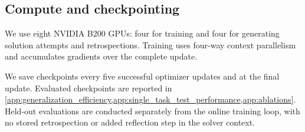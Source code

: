 \subsection{Compute and checkpointing}

We use eight NVIDIA B200 GPUs: four for training and four for
generating solution attempts and retrospections. Training uses
four-way context parallelism and accumulates gradients over the
complete update.

We save checkpoints every five successful optimizer updates and at the
final update. Evaluated checkpoints are reported in
\cref{app:generalization_efficiency,app:single_task_test_performance,app:ablations}.
Held-out evaluations are conducted separately from the online training
loop, with no stored retrospection or added reflection step in the
solver context.
